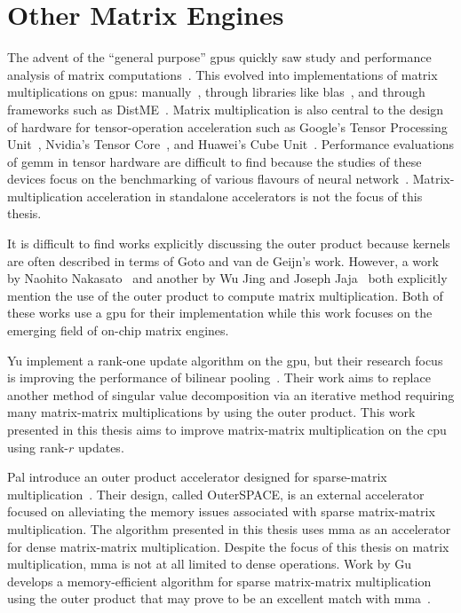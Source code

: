 \documentclass[\main/thesis.tex]{subfiles}
\begin{document}
\section{Other Matrix Engines}
The advent of the ``general purpose'' \glspl{gpu} quickly saw study and performance analysis of matrix computations~\autocite{larsen2001fast,fatahalian2004understanding}.
This evolved into implementations of matrix multiplications on \glspl{gpu}: manually~\autocite{li2011strassens}, through libraries like \gls{blas}~\autocite{nath2011accelerating}, and through frameworks such as DistME~\autocite{han2019distme}.
Matrix multiplication is also central to the design of hardware for tensor-operation acceleration such as Google's Tensor Processing Unit~\autocite{jouppi2017datacenter}, Nvidia's Tensor Core~\autocite{markidis2018nvidia}, and Huawei's Cube Unit~\autocite{liao2019davinci}.
Performance evaluations of \gls{gemm} in tensor hardware are difficult to find because the studies of these devices focus on the benchmarking of various flavours of neural network~\autocite{jouppi2017datacenter,wang2019benchmarking}.
Matrix-multiplication acceleration in standalone accelerators is not the focus of this thesis.

It is difficult to find works explicitly discussing the outer product because kernels are often described in terms of Goto and van de Geijn's work.
However, a work by Naohito Nakasato~\autocite{nakasato2011fast} and another by Wu Jing and Joseph Jaja~\autocite{wu2016achieving} both explicitly mention the use of the outer product to compute matrix multiplication.
Both of these works use a \gls{gpu} for their implementation while this work focuses on the emerging field of on-chip matrix engines.

Yu \etal implement a rank-one update algorithm on the \gls{gpu}, but their research focus is improving the performance of bilinear pooling~\autocite{yu2020toward}.
Their work aims to replace another method of singular value decomposition via an iterative method requiring many matrix-matrix multiplications by using the outer product.
This work presented in this thesis aims to improve matrix-matrix multiplication on the \gls{cpu} using rank-$r$ updates.

Pal \etal introduce an outer product accelerator designed for sparse-matrix multiplication~\autocite{pal2018outerspace}.
Their design, called OuterSPACE, is an external accelerator focused on alleviating the memory issues associated with sparse matrix-matrix multiplication.
The algorithm presented in this thesis uses \gls{mma} as an accelerator for dense matrix-matrix multiplication.
Despite the focus of this thesis on matrix multiplication, \gls{mma} is not at all limited to dense operations.
Work by Gu \etal develops a memory-efficient algorithm for sparse matrix-matrix multiplication using the outer product that may prove to be an excellent match with \gls{mma}~\autocite{gu2020bandwidth}.
\end{document}
